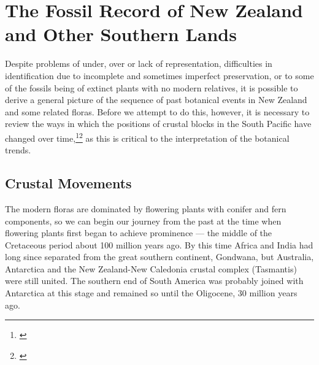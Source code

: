 \section{The Fossil Record of New Zealand and Other Southern Lands}

Despite problems of under, over or lack of representation, difficulties in identification due to incomplete and sometimes imperfect preservation, or to some of the fossils being of extinct plants with no modern relatives, it is possible to derive a general picture of the sequence of past botanical events in New Zealand and some related floras.
Before we attempt to do this, however, it is necessary to review the ways in which the positions of crustal blocks in the South Pacific have changed over time,\footnote{\cite{kemp1978tertiary}}\footnote{\cite{crook1981break}} as this is critical to the interpretation of the botanical trends.

\subsection{Crustal Movements}

The modern floras are dominated by flowering plants with conifer and fern components, so we can begin our journey from the past at the time when flowering plants first began to achieve prominence --- the middle of the Cretaceous period about 100 million years ago.
By this time Africa and India had long since separated from the great southern continent, Gondwana, but Australia, Antarctica and the New Zealand-New Caledonia crustal complex (Tasmantis) were still united.
The southern end of South America was probably joined with Antarctica at this stage and remained so until the Oligocene, 30 million years ago.

